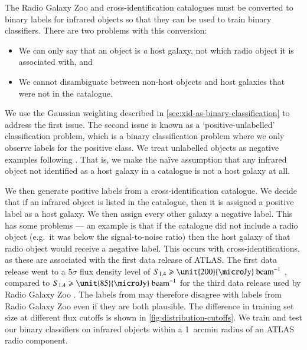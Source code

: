 \documentclass[fleqn,usenatbib,usedcolumn]{mnras}
\newcommand{\jansky}{\text{Jy}}
\newcommand{\edited}[1]{{\bf {#1}}}
\begin{document}
    \edited{The Radio Galaxy Zoo and \citet{norris06} cross-identification
    catalogues must be converted to binary labels for infrared objects so that
    they can be used to train binary classifiers. There are two problems with this conversion:
    \begin{itemize}
      \item We can only say that an object is \emph{a} host galaxy, not which radio object it is associated with, and
      \item We cannot disambiguate between non-host objects and host galaxies that were not in the catalogue.
    \end{itemize}
    
    We use the Gaussian weighting described in \autoref{sec:xid-as-binary-classification} to address the first issue.
    The second issue is known as a `positive-unlabelled' classification problem, which is
    a binary classification problem where we only observe labels for the
    positive class. We treat unlabelled objects as negative examples following
    \citet{menon15cpe}. That is, we make the na\"ive assumption that any
    infrared object not identified as a host galaxy in a catalogue is not a host galaxy at all.}

    We then generate positive labels from a cross-identification catalogue.
    We decide that if an infrared object is listed in the catalogue, then it
    is assigned a positive label as a host galaxy. We then assign every other galaxy a negative label. This has some problems
    --- an example is that if the catalogue did not include a radio
    object (e.g.~it was below the signal-to-noise ratio) then the host galaxy
    of that radio object would receive a negative label. This occurs with
    \citet{norris06} cross-identifications, as these are associated with the
    first data release of ATLAS. The first data release went to a 5$\sigma$
    flux density level of $S_{1.4} \geq \unit{200}{\micro\jansky}\text{
    beam}^{-1}$ \citep{norris06}, compared to $S_{1.4} \geq \unit{85}{\micro\jansky}\text{
    beam}^{-1}$ for the third data release used by Radio Galaxy Zoo
    \citep{franzen15}. The labels from \citet{norris06} may therefore disagree with labels
    from Radio Galaxy Zoo even if they are both plausible. The difference in
    training set size at different flux cutoffs is shown in
    \autoref{fig:distribution-cutoffs}. We train and test our binary
    classifiers on infrared objects within a 1~arcmin radius of an ATLAS radio
    component.
\end{document}
